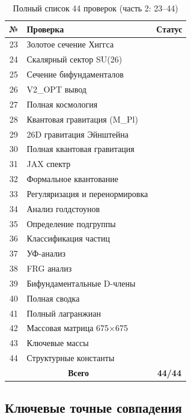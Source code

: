 \documentclass[12pt,a4paper,twoside]{article}
\newcommand{\checkmarkgreen}{\textcolor{emerald}{\checkmark}}
\theoremstyle{definition}
\begin{document}
\begin{table}[H]
\centering
\small
\caption{Полный список 44 проверок (часть 2: 23--44)}
\label{tab:44_breakdown_b}
\begin{tabular}{c|l|c}
\toprule
\textbf{№} & \textbf{Проверка} & \textbf{Статус} \\
\midrule
23 & Золотое сечение Хиггса & \checkmarkgreen \\
24 & Скалярный сектор SU(26) & \checkmarkgreen \\
25 & Сечение бифундаменталов & \checkmarkgreen \\
26 & V2\_OPT вывод & \checkmarkgreen \\
27 & Полная космология & \checkmarkgreen \\
28 & Квантовая гравитация (M\_Pl) & \checkmarkgreen \\
29 & 26D гравитация Эйнштейна & \checkmarkgreen \\
30 & Полная квантовая гравитация & \checkmarkgreen \\
31 & JAX спектр & \checkmarkgreen \\
32 & Формальное квантование & \checkmarkgreen \\
33 & Регуляризация и перенормировка & \checkmarkgreen \\
34 & Анализ голдстоунов & \checkmarkgreen \\
35 & Определение подгруппы & \checkmarkgreen \\
36 & Классификация частиц & \checkmarkgreen \\
37 & УФ-анализ & \checkmarkgreen \\
38 & FRG анализ & \checkmarkgreen \\
39 & Бифундаментальные D-члены & \checkmarkgreen \\
40 & Полная сводка & \checkmarkgreen \\
41 & Полный лагранжиан & \checkmarkgreen \\
42 & Массовая матрица 675×675 & \checkmarkgreen \\
43 & Ключевые массы & \checkmarkgreen \\
44 & Структурные константы & \checkmarkgreen \\
\midrule
\multicolumn{2}{c|}{\textbf{Всего}} & \textbf{\checkmarkgreen 44/44} \\
\bottomrule
\end{tabular}
\end{table}

\subsection{Ключевые точные совпадения}
\end{document}
